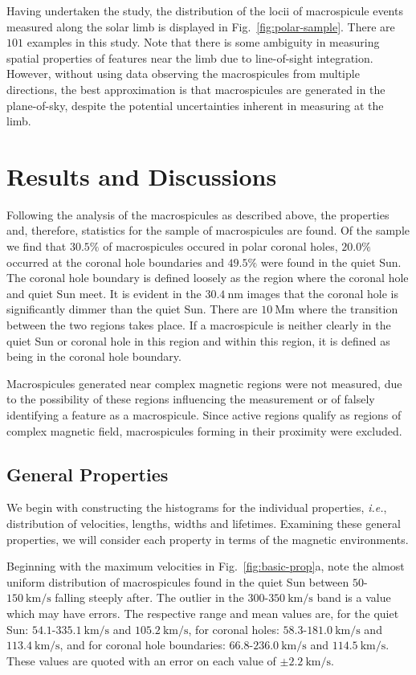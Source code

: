 Having undertaken the study, the distribution of the locii of macrospicule events measured along the solar limb is displayed in Fig.~\ref{fig:polar-sample}. There are $101$ examples in this study. Note that there is some ambiguity in measuring spatial properties of features near the limb due to line-of-sight integration. However, without using data observing the macrospicules from multiple directions, the best approximation is that macrospicules are generated in the plane-of-sky, despite the potential uncertainties inherent in measuring at the limb.



\section{Results and Discussions}
Following the analysis of the macrospicules as described above, the properties and, therefore, statistics for the sample of macrospicules are found. Of the sample we find that $30.5\%$ of macrospicules occured in polar coronal holes, $20.0\%$ occurred at the coronal hole boundaries and $49.5\%$ were found in the quiet Sun. The coronal hole boundary is defined loosely as the region where the coronal hole and quiet Sun meet. It is evident in the $30.4\ \textrm{nm}$ images that the coronal hole is significantly dimmer than the quiet Sun. There are $10\ \textrm{Mm}$ where the transition between the two regions takes place. If a macrospicule is neither clearly in the quiet Sun or coronal hole in this region and within this region, it is defined as being in the coronal hole boundary.

Macrospicules generated near complex magnetic regions were not measured, due to the possibility of these regions influencing the measurement or of falsely identifying a feature as a macrospicule. Since active regions qualify as regions of complex magnetic field, macrospicules forming in their proximity were excluded.


\subsection{General Properties}
We begin with constructing the histograms for the individual properties, \emph{i.e.}, distribution of velocities, lengths, widths and lifetimes. Examining these general properties, we will consider each property in terms of the magnetic environments.

Beginning with the maximum velocities in Fig.~\ref{fig:basic-prop}a, note the almost uniform distribution of macrospicules found in the quiet Sun between $50$-$150\ \textrm{km/s}$ falling steeply after. The outlier in the $300$-$350\ \textrm{km/s}$ band is a value which may have errors. The respective range and mean values are, for the quiet Sun: $54.1$-$335.1\ \textrm{km/s}$ and $105.2\ \textrm{km/s}$, for coronal holes: $58.3$-$181.0\ \textrm{km/s}$ and $113.4\ \textrm{km/s}$, and for coronal hole boundaries: $66.8$-$236.0\ \textrm{km/s}$ and $114.5\ \textrm{km/s}$. These values are quoted with an error on each value of $\pm2.2\ \textrm{km/s}$.


